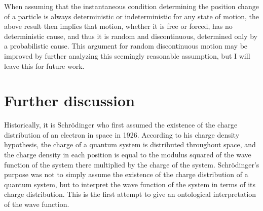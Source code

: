 When assuming that the instantaneous condition determining the position change of a particle is always deterministic or indeterministic for any state of motion, the above result then implies that motion, whether it is free or forced, has no deterministic cause, and thus it is random and discontinuous,  determined only by a probabilistic cause. This argument for random discontinuous motion may be improved by further analyzing this seemingly reasonable assumption, but I will leave this for future work.

\section{Further discussion}

Historically, it is Schr\"{o}dinger who first assumed the existence of the charge distribution of an electron in space in 1926. According to his charge density hypothesis, the charge of a quantum system is distributed throughout space, and the charge density in each position is equal to the modulus squared of the wave function of the system there multiplied by the charge of the system.
Schr\"{o}dinger's purpose was not to simply assume the existence of the charge distribution of a quantum system, but to interpret the wave function of the system in terms of its charge distribution. This is the first attempt to give an ontological interpretation of the wave function.


